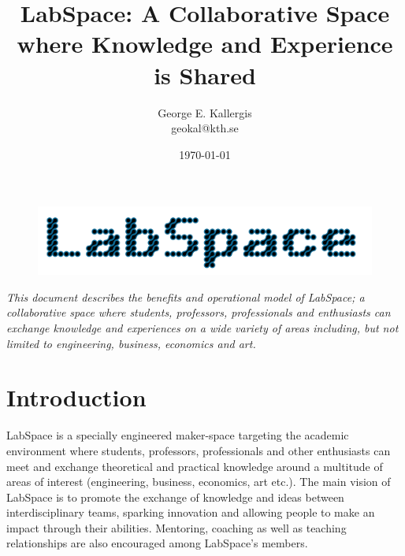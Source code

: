 \documentclass[a4paper, 11pt]{article}
\title{LabSpace: A Collaborative Space where Knowledge and Experience is Shared}
\author{George E. Kallergis\\geokal@kth.se}
\date{\today{}}
\begin{document}
\maketitle

\begin{figure}[h!]
  \begin{center}
    \includegraphics[width=\textwidth,height=\textheight,keepaspectratio]{imagery/logo.png}
    \label{fig:dneaf}
  \end{center}
\end{figure}

\textit{This document describes the benefits and operational model of LabSpace; a collaborative space where students, professors, professionals and enthusiasts can exchange knowledge and experiences on a wide variety of areas including, but not limited to engineering, business, economics and art.}

\newpage

\section*{Introduction}
LabSpace is a specially engineered maker-space \cite{whatsamakerspace} targeting the academic environment where students, professors, professionals and other enthusiasts can meet and exchange theoretical and practical knowledge around a multitude of areas of interest (engineering, business, economics, art etc.). The main vision of LabSpace is to promote the exchange of knowledge and ideas between interdisciplinary teams, sparking innovation and allowing people to make an impact through their abilities. Mentoring, coaching as well as teaching relationships are also encouraged among LabSpace's members.
\end{document}
